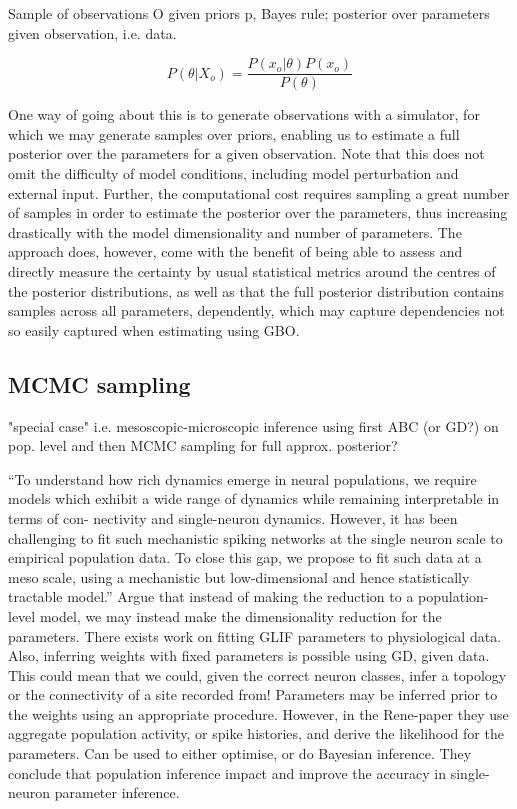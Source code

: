 \documentclass[mphil,deptreport,ianc]{infthesis} %
\begin{document}
Sample of observations O given priors p, Bayes rule; posterior over parameters given observation, i.e. data.

\begin{equation}
    P(\theta|X_o) = \frac{P(x_o|\theta)P(x_o)}{P(\theta)}
\end{equation}

One way of going about this is to generate observations with a simulator, for which we may generate samples over priors, enabling us to estimate a full posterior over the parameters for a given observation.
Note that this does not omit the difficulty of model conditions, including model perturbation and external input.
Further, the computational cost requires sampling a great number of samples in order to estimate the posterior over the parameters, thus increasing drastically with the model dimensionality and number of parameters.
The approach does, however, come with the benefit of being able to assess and directly measure the certainty by usual statistical metrics around the centres of the posterior distributions, as well as that the full posterior distribution contains samples across all parameters, dependently, which may capture dependencies not so easily captured when estimating using GBO.

\subsection{MCMC sampling}
\cite{Rene2020} "special case" i.e. mesoscopic-microscopic inference using first ABC (or GD?) on pop. level and then MCMC sampling for full approx. posterior?

“To understand how rich dynamics emerge in neural populations, we require models which exhibit a wide range of dynamics while remaining interpretable in terms of con- nectivity and single-neuron dynamics. However, it has been challenging to fit such mechanistic spiking networks at the single neuron scale to empirical population data. To close this gap, we propose to fit such data at a meso scale, using a mechanistic but low-dimensional and hence statistically tractable model.”
Argue that instead of making the reduction to a population-level model, we may instead make the dimensionality reduction for the parameters.
There exists work on fitting GLIF parameters to physiological data. 
Also, inferring weights with fixed parameters is possible using GD, given data.
This could mean that we could, given the correct neuron classes, infer a topology or the connectivity of a site recorded from!
Parameters may be inferred prior to the weights using an appropriate procedure.
However, in the Rene-paper they use aggregate population activity, or spike histories, and derive the likelihood for the parameters. Can be used to either optimise, or do Bayesian inference.
They conclude that population inference impact and improve the accuracy in single-neuron parameter inference.
\end{document}
